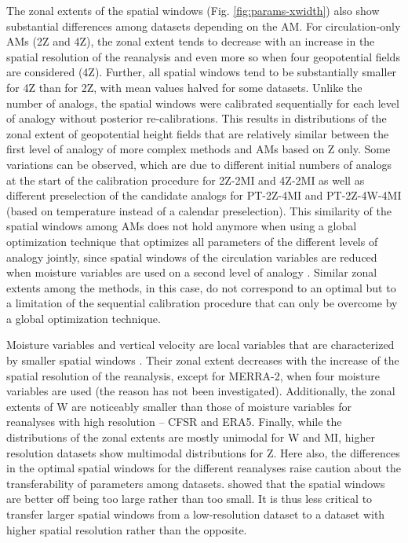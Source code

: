 \documentclass[alpha-refs]{wiley-article}
\begin{document}
The zonal extents of the spatial windows (Fig. \ref{fig:params-xwidth}) also show substantial differences among datasets depending on the AM. For circulation-only AMs (2Z and 4Z), the zonal extent tends to decrease with an increase in the spatial resolution of the reanalysis and even more so when four geopotential fields are considered (4Z). Further, all spatial windows tend to be substantially smaller for 4Z than for 2Z, with mean values halved for some datasets. Unlike the number of analogs, the spatial windows were calibrated sequentially for each level of analogy without posterior re-calibrations. This results in distributions of the zonal extent of geopotential height fields that are relatively similar between the first level of analogy of more complex methods and AMs based on Z only. Some variations can be observed, which are due to different initial numbers of analogs at the start of the calibration procedure for 2Z-2MI and 4Z-2MI as well as different preselection of the candidate analogs for PT-2Z-4MI and PT-2Z-4W-4MI (based on temperature instead of a calendar preselection). This similarity of the spatial windows among AMs does not hold anymore when using a global optimization technique that optimizes all parameters of the different levels of analogy jointly, since spatial windows of the circulation variables are reduced when moisture variables are used on a second level of analogy \citep{Horton2018a}. Similar zonal extents among the methods, in this case, do not correspond to an optimal but to a limitation of the sequential calibration procedure that can only be overcome by a global optimization technique.

Moisture variables and vertical velocity are local variables that are characterized by smaller spatial windows \citep{BenDaoud2016, Horton2018a}. Their zonal extent decreases with the increase of the spatial resolution of the reanalysis, except for MERRA-2, when four moisture variables are used (the reason has not been investigated). Additionally, the zonal extents of W are noticeably smaller than those of moisture variables for reanalyses with high resolution -- CFSR and ERA5. Finally, while the distributions of the zonal extents are mostly unimodal for W and MI, higher resolution datasets show multimodal distributions for Z. Here also, the differences in the optimal spatial windows for the different reanalyses raise caution about the transferability of parameters among datasets. \citet{Horton2019} showed that the spatial windows are better off being too large rather than too small. It is thus less critical to transfer larger spatial windows from a low-resolution dataset to a dataset with higher spatial resolution rather than the opposite. 
\end{document}
